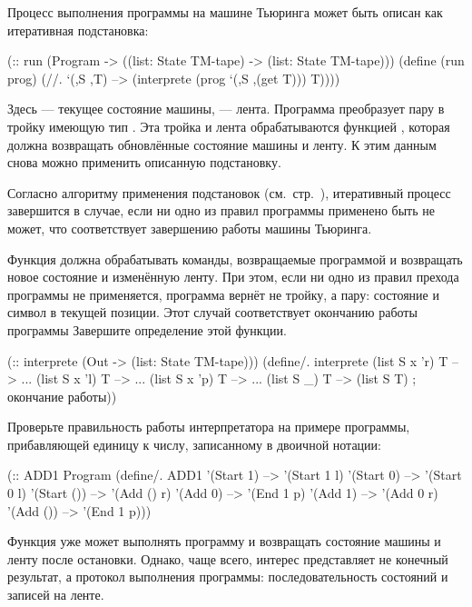 Процесс выполнения программы на машине Тьюринга может быть описан как итеративная подстановка:
\begin{Definition}[emph={S,T,prog}]
(:: run (Program -> ((list: State TM-tape) -> 
                     (list: State TM-tape)))
  (define (run prog)
    (//. `(,S ,T) --> (interprete (prog `(,S ,(get T))) T))))
\end{Definition}

Здесь  --- текущее состояние машины,  --- лента. Программа  преобразует пару  в тройку имеющую тип . Эта тройка и лента обрабатываются функцией , которая должна  возвращать обновлённые состояние машины и ленту. К этим данным снова можно применить описанную подстановку. 

Согласно алгоритму применения подстановок (см.~стр.~\pageref{rewriting-semantics}), итеративный процесс завершится в случае, если ни одно из правил программы применено быть не может, что соответствует завершению работы машины Тьюринга.

\begin{Assignment}
  Функция  должна обрабатывать команды, возвращаемые программой и возвращать новое состояние и изменённую ленту. При этом, если ни одно из правил прехода программы не применяется, программа вернёт не тройку, а пару: состояние и символ в текущей позиции. Этот случай соответствует окончанию работы программы
Завершите определение этой функции.
\begin{SchemeCode}[emph={S,T,v}]
(:: interprete (Out -> (list: State TM-tape)))
  (define/. interprete
    (list S x 'r) T --> ...
    (list S x 'l) T --> ...
    (list S x 'p) T --> ...
    (list S _) T --> (list S T) ; окончание работы))
\end{SchemeCode}

Проверьте правильность работы интерпретатора на примере программы, прибавляющей единицу к числу, записанному в двоичной нотации:
\begin{SchemeCode}
(:: ADD1 Program
  (define/. ADD1
    '(Start 1) --> '(Start 1 l) 
    '(Start 0) --> '(Start 0 l) 
    '(Start ()) --> '(Add () r) 
    '(Add 0) --> '(End 1 p) 
    '(Add 1) --> '(Add 0 r) 
    '(Add ()) --> '(End 1 p)))
\end{SchemeCode}
\end{Assignment}

Функция  уже может выполнять программу и возвращать состояние машины и ленту после остановки. Однако, чаще всего, интерес представляет не конечный результат, а протокол выполнения программы: последовательность состояний и записей на ленте.

